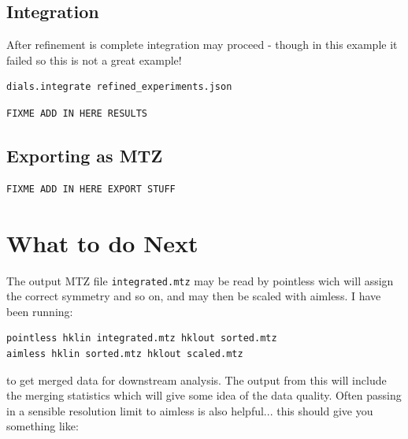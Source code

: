 \documentclass[a4paper, 11pt]{article}
\begin{document}
\subsection{Integration}

After refinement is complete integration may proceed - though in this
example it failed so this is not a great example!

{\small
\begin{verbatim}
dials.integrate refined_experiments.json 
\end{verbatim}
}

{\small
\begin{verbatim}
FIXME ADD IN HERE RESULTS
\end{verbatim}
}

\subsection{Exporting as MTZ}

{\small
\begin{verbatim}
FIXME ADD IN HERE EXPORT STUFF
\end{verbatim}
}

\section{What to do Next}

The output MTZ file \verb|integrated.mtz| may be read by pointless wich will assign the correct symmetry and so on, and may then be scaled with aimless. I have been running:

{\small
\begin{verbatim}
pointless hklin integrated.mtz hklout sorted.mtz
aimless hklin sorted.mtz hklout scaled.mtz
\end{verbatim}
}

\noindent
to get merged data for downstream analysis. The output from this will
include the merging statistics which will give some idea of the data
quality. Often passing in a sensible resolution limit to aimless is
also helpful... this should give you something like:
\end{document}
